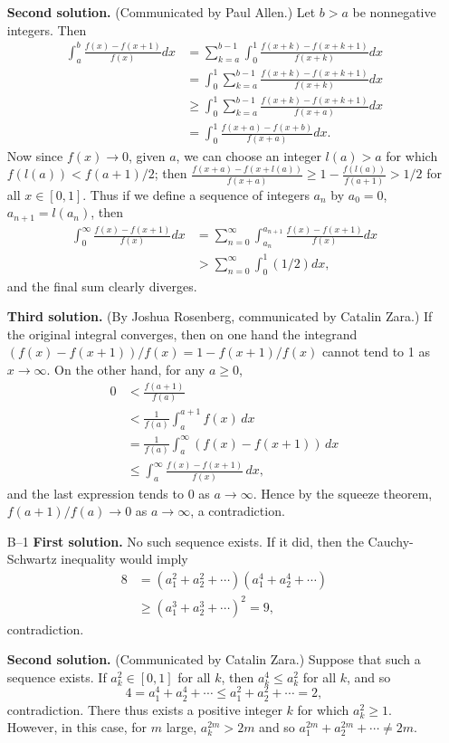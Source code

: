 \documentclass[amssymb,twocolumn,pra,10pt,aps]{revtex4-1}
\begin{document}
\begin{itemize}
\textbf{Second solution.}
(Communicated by Paul Allen.)
Let $b>a$ be nonnegative integers. Then
\begin{align*}
\int_a^b \frac{f(x)-f(x+1)}{f(x)}dx &=
\sum_{k=a}^{b-1} \int_0^1 \frac{f(x+k)-f(x+k+1)}{f(x+k)}dx \\
&= \int_0^1 \sum_{k=a}^{b-1} \frac{f(x+k)-f(x+k+1)}{f(x+k)}dx \\
&\geq \int_0^1 \sum_{k=a}^{b-1} \frac{f(x+k)-f(x+k+1)}{f(x+a)}dx \\
&= \int_0^1 \frac{f(x+a)-f(x+b)}{f(x+a)} dx.
\end{align*}
Now since $f(x)\rightarrow 0$, given $a$, we can choose an integer $l(a)>a$ for which $f(l(a)) < f(a+1)/2$; then $\frac{f(x+a)-f(x+l(a))}{f(x+a)} \geq 1 - \frac{f(l(a))}{f(a+1)} > 1/2$ for all $x\in [0,1]$. Thus if we define a sequence of integers $a_n$ by $a_0=0$, $a_{n+1}=l(a_n)$, then
\begin{align*}
\int_0^\infty \frac{f(x)-f(x+1)}{f(x)} dx &=
\sum_{n=0}^\infty \int_{a_n}^{a_{n+1}} \frac{f(x)-f(x+1)}{f(x)} dx \\
&> \sum_{n=0}^\infty \int_0^1 (1/2) dx,
\end{align*}
and the final sum clearly diverges.

\textbf{Third solution.}
(By Joshua Rosenberg, communicated by Catalin Zara.)
If the original integral converges, then
on one hand the integrand $(f(x)-f(x+1))/f(x) = 1 - f(x+1)/f(x)$
cannot tend to 1 as $x \to \infty$.
On the other hand, for any $a \geq 0$,
\begin{align*}
0 &< \frac{f(a+1)}{f(a)} \\
&< \frac{1}{f(a)} \int_a^{a+1} f(x)\,dx \\
&= \frac{1}{f(a)} \int_a^\infty (f(x) - f(x+1))\,dx \\
&\leq \int_a^\infty \frac{f(x) - f(x+1)}{f(x)}\,dx,
\end{align*}
and the last expression tends to 0 as $a \to \infty$.
Hence by the squeeze theorem, $f(a+1)/f(a) \to 0$ as $a \to \infty$, a contradiction.

\item[B--1]
\textbf{First solution.}
No such sequence exists. If it did, then the Cauchy-Schwartz inequality would imply
\begin{align*}
8 &= (a_1^2 + a_2^2 +  \cdots)(a_1^4 + a_2^4 + \cdots) \\
&\geq (a_1^3 + a_2^3 + \cdots)^2 = 9,
\end{align*}
contradiction.

\textbf{Second solution.}
(Communicated by Catalin Zara.)
Suppose that such a sequence exists.
If $a_k^2 \in [0,1]$ for all $k$, then $a_k^4 \leq a_k^2$ for all $k$, and so
\[
4 = a_1^4 + a_2^4 + \cdots \leq a_1^2 + a_2^2 + \cdots = 2,
\]
contradiction. There thus exists a positive integer $k$ for which $a_k^2 \geq 1$.
However, in this case, for $m$ large, $a_k^{2m} > 2m$ and so
$a_1^{2m} + a_2^{2m} + \cdots \neq 2m$.


\end{itemize}
\end{document}
